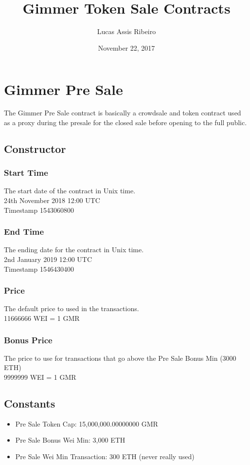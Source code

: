 \documentclass[11pt]{article} %
\title{Gimmer Token Sale Contracts}
\author{Lucas Assis Ribeiro}
\date{November 22, 2017} %
\begin{document}
\maketitle

\section {Gimmer Pre Sale}

The Gimmer Pre Sale contract is basically a crowdsale and token contract used as a proxy during the presale for the closed sale before opening to the full public.

\subsection{Constructor}
\subsubsection{Start Time}
The start date of the contract in Unix time. \\
24th November 2018 12:00 UTC\\
Timestamp 1543060800

\subsubsection{End Time}
The ending date for the contract in Unix time.\\
2nd January 2019 12:00 UTC\\
Timestamp 1546430400

\subsubsection{Price}
The default price to used in the transactions.\\
11666666 WEI = 1 GMR

\subsubsection{Bonus Price}
The price to use for transactions that go above the Pre Sale Bonus Min (3000 ETH)\\
9999999 WEI = 1 GMR


\subsection{Constants}
\begin{itemize}
\item Pre Sale Token Cap: 15,000,000.00000000 GMR
\item Pre Sale Bonus Wei Min: 3,000 ETH
\item Pre Sale Wei Min Transaction: 300 ETH (never really used)
\end{itemize}
\end{document}
